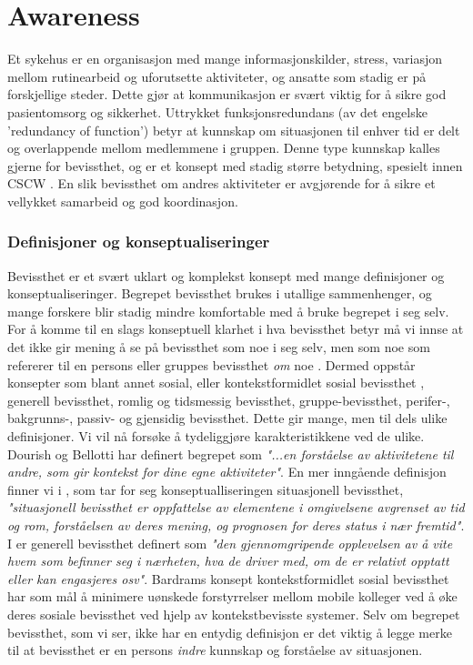 \section{Awareness}
\label{chp: awareness}

Et sykehus er en organisasjon med mange informasjonskilder, stress, variasjon mellom rutinearbeid og uforutsette aktiviteter, og ansatte som stadig er på forskjellige steder. Dette gjør at kommunikasjon er svært viktig for å sikre god pasientomsorg og sikkerhet\cite{Klemets12}. Uttrykket funksjonsredundans (av det engelske 'redundancy of function') betyr at kunnskap om situasjonen til enhver tid er delt og overlappende mellom medlemmene i gruppen\cite{KlemetsRedundancy}. Denne type kunnskap kalles gjerne for bevissthet, og er et konsept med stadig større betydning, spesielt innen CSCW \cite{Dourish92}. En slik bevissthet om andres aktiviteter er avgjørende for å sikre et vellykket samarbeid og god koordinasjon\cite{KlemetsRedundancy}. 

\subsubsection{Definisjoner og konseptualiseringer}
Bevissthet er et svært uklart og komplekst konsept med mange definisjoner og konseptualiseringer\cite{KlemetsRedundancy, Gutwin04, Schmidt02}. Begrepet bevissthet brukes i utallige sammenhenger, og mange forskere blir stadig mindre komfortable med å bruke begrepet i seg selv. For å komme til en slags konseptuell klarhet i hva bevissthet betyr må vi innse at det ikke gir mening å se på bevissthet som noe i seg selv, men som noe som refererer til en persons eller gruppes bevissthet \emph{om} noe \cite{Schmidt02}. Dermed oppstår konsepter som blant annet sosial, eller kontekstformidlet sosial bevissthet \cite{Bardram04}, generell bevissthet\cite{Gross13}, romlig og tidsmessig bevissthet\cite{Randell}, gruppe-bevissthet\cite{Gutwin04}, perifer-, bakgrunns-, passiv- og gjensidig bevissthet\cite{Schmidt02}. Dette gir mange, men til dels ulike definisjoner. Vi vil nå forsøke å tydeliggjøre karakteristikkene ved de ulike. Dourish og Bellotti har definert begrepet som \emph{"...en forståelse av aktivitetene til andre, som gir kontekst for dine egne aktiviteter"}. En mer inngående definisjon finner vi i \cite{Endsly95}, som tar for seg konseptualliseringen situasjonell bevissthet, \emph{"situasjonell bevissthet er oppfattelse av elementene i omgivelsene avgrenset av tid og rom, forståelsen av deres mening, og prognosen for deres status i nær fremtid"}. I \cite{Gross13} er generell bevissthet definert som \emph{"den gjennomgripende opplevelsen av å vite hvem som befinner seg i nærheten, hva de driver med, om de er relativt opptatt eller kan engasjeres osv"}. Bardrams konsept kontekstformidlet sosial bevissthet har som mål å minimere uønskede forstyrrelser mellom mobile kolleger ved å øke deres sosiale bevissthet ved hjelp av kontekstbevisste systemer\cite{Bardram04}. Selv om begrepet bevissthet, som vi ser, ikke har en entydig definisjon er det viktig å legge merke til at bevissthet er en persons \emph{indre} kunnskap og forståelse av situasjonen\cite{Gross13}. 

